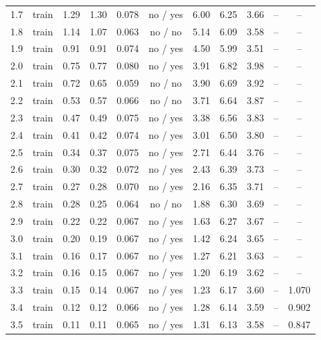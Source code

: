 {\begin{longtable}{llccccccccc}
\rule[-3pt]{0pt}{11.5pt} 1.7 & train & 1.29 & 1.30 & 0.078 & no / yes & 6.00 & 6.25 & 3.66 & -- & -- \\
\rule[-3pt]{0pt}{11.5pt} 1.8 & train & 1.14 & 1.07 & 0.063 & no / no & 5.14 & 6.09 & 3.58 & -- & -- \\
\rule[-3pt]{0pt}{11.5pt} 1.9 & train & 0.91 & 0.91 & 0.074 & no / yes & 4.50 & 5.99 & 3.51 & -- & -- \\
\rule[-3pt]{0pt}{11.5pt} 2.0 & train & 0.75 & 0.77 & 0.080 & no / yes & 3.91 & 6.82 & 3.98 & -- & -- \\
\rule[-3pt]{0pt}{11.5pt} 2.1 & train & 0.72 & 0.65 & 0.059 & no / no & 3.90 & 6.69 & 3.92 & -- & -- \\
\rule[-3pt]{0pt}{11.5pt} 2.2 & train & 0.53 & 0.57 & 0.066 & no / no & 3.71 & 6.64 & 3.87 & -- & -- \\
\rule[-3pt]{0pt}{11.5pt} 2.3 & train & 0.47 & 0.49 & 0.075 & no / yes & 3.38 & 6.56 & 3.83 & -- & -- \\
\rule[-3pt]{0pt}{11.5pt} 2.4 & train & 0.41 & 0.42 & 0.074 & no / yes & 3.01 & 6.50 & 3.80 & -- & -- \\
\rule[-3pt]{0pt}{11.5pt} 2.5 & train & 0.34 & 0.37 & 0.075 & no / yes & 2.71 & 6.44 & 3.76 & -- & -- \\
\rule[-3pt]{0pt}{11.5pt} 2.6 & train & 0.30 & 0.32 & 0.072 & no / yes & 2.43 & 6.39 & 3.73 & -- & -- \\
\rule[-3pt]{0pt}{11.5pt} 2.7 & train & 0.27 & 0.28 & 0.070 & no / yes & 2.16 & 6.35 & 3.71 & -- & -- \\
\rule[-3pt]{0pt}{11.5pt} 2.8 & train & 0.28 & 0.25 & 0.064 & no / no & 1.88 & 6.30 & 3.69 & -- & -- \\
\rule[-3pt]{0pt}{11.5pt} 2.9 & train & 0.22 & 0.22 & 0.067 & no / yes & 1.63 & 6.27 & 3.67 & -- & -- \\
\rule[-3pt]{0pt}{11.5pt} 3.0 & train & 0.20 & 0.19 & 0.067 & no / yes & 1.42 & 6.24 & 3.65 & -- & -- \\
\rule[-3pt]{0pt}{11.5pt} 3.1 & train & 0.16 & 0.17 & 0.067 & no / yes & 1.27 & 6.21 & 3.63 & -- & -- \\
\rule[-3pt]{0pt}{11.5pt} 3.2 & train & 0.16 & 0.15 & 0.067 & no / yes & 1.20 & 6.19 & 3.62 & -- & -- \\
\rule[-3pt]{0pt}{11.5pt} 3.3 & train & 0.15 & 0.14 & 0.067 & no / yes & 1.23 & 6.17 & 3.60 & -- & 1.070 \\
\rule[-3pt]{0pt}{11.5pt} 3.4 & train & 0.12 & 0.12 & 0.066 & no / yes & 1.28 & 6.14 & 3.59 & -- & 0.902 \\
\rule[-3pt]{0pt}{11.5pt} 3.5 & train & 0.11 & 0.11 & 0.065 & no / yes & 1.31 & 6.13 & 3.58 & -- & 0.847 \\

\end{longtable}}
